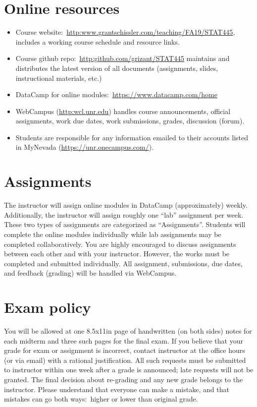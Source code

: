 \documentclass[11pt,onecolumn]{article}
\begin{document}
\section*{Online resources}
\begin{itemize}
    \itemsep0em
\item Course website:~\url{http:www.grantschissler.com/teaching/FA19/STAT445}, includes a working course schedule and resource links.
\item Course github repo:~\url{http:github.com/grizant/STAT445} maintains and distributes the latest version of all documents (assignments, slides, instructional materials, etc.)
  \item DataCamp for online modules:~\url{https://www.datacamp.com/home}
  \item WebCampus (\url{http:wcl.unr.edu}) handles course announcements, official assignments, work due dates, work submissions, grades, discussion (forum).
  \item Students are responsible for any information emailed to their accounts listed in MyNevada (\url{https://unr.onecampus.com/}).
\end{itemize}

\section*{Assignments}
The instructor will assign online modules in DataCamp (approximately) weekly. Additionally, the instructor will assign roughly one ``lab'' assignment per week. These two types of assignments are categorized as ``Assignments''. Students will complete the online modules individually while lab assignments may be completed collaboratively. You are highly encouraged to discuss assignments between each other and with your instructor. However, the works must be completed and submitted individually. All assignment, submissions, due dates, and feedback (grading) will be handled via WebCampus.

\section*{Exam policy} You will be allowed at one 8.5x11in page of handwritten (on both sides) notes for each midterm and three such pages for the final exam. If you believe that your grade for exam or assignment is incorrect, contact instructor at the office hours (or via email) with a rational justification. All such requests must be submitted to instructor within one week after a grade is announced; late requests will not be granted. The final decision about re-grading and any new grade belongs to the instructor. Please understand that everyone can make a mistake, and that mistakes can go both ways:~higher or lower than original grade.
\end{document}
